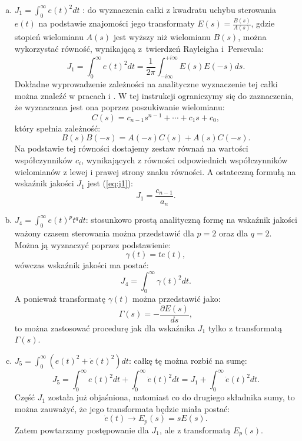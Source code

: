 \documentclass{article}
\begin{document}
    \begin{enumerate}[(a)]
        \item $J_{1} = \int_{0}^{\infty}{e(t)^{2}dt}$ : do wyznaczenia całki z kwadratu uchybu sterowania $e(t)$ na podstawie znajomości jego transformaty $E(s) = \frac{B(s)}{A(s)}$, gdzie stopień wielomianu $A(s)$ jest wyższy niż wielomianu $B(s)$, można wykorzystać równość, wynikającą z~twierdzeń Rayleigha i~Persevala:
        $$
            J_{1}
            =
            \int_{0}^{\infty}{e(t)^{2}dt}
            =
            \frac{1}{2\pi}\int_{-i\infty}^{+i\infty}{E(s)E(-s)ds}.
        $$
        Dokładne wyprowadzenie zależności na analityczne wyznaczenie tej całki można znaleźć w pracach \cite{Mitkowski2007} i \cite{Gorecki1993}.
        W tej instrukcji ograniczymy się do zaznaczenia, że wyznaczana jest ona poprzez poszukiwanie wielomianu:
        $$
            C(s) = c_{n-1}s^{n-1} + \cdots + c_{1}s + c_{0},
        $$
        który spełnia zależność:
        $$
            B(s)B(-s) = A(-s)C(s) + A(s)C(-s).
        $$
        Na podstawie tej równości dostajemy zestaw równań na wartości współczynników $c_i$, wynikających z równości odpowiednich współczynników wielomianów z lewej i prawej strony znaku równości.
        A ostateczną formułą na wskaźnik jakości $J_{1}$ jest (\ref{eq:j1}):
        \begin{equation}
            J_{1} = \frac{c_{n-1}}{a_{n}}.
        \end{equation}

        \item $J_{4} = \int_{0}^{\infty}{e(t)^{p}t^{q}dt}$: stosunkowo prostą analityczną formę na wskaźnik jakości ważony czasem sterowania można przedstawić dla $p =2$ oraz dla $q = 2$.
        Można ją wyznaczyć poprzez podstawienie:
        $$
            \gamma(t) = te(t),
        $$
        wówczas wskaźnik jakości ma postać:
        $$
            J_{4} = \int_{0}^{\infty}{\gamma(t)^{2}dt}.
        $$
        A ponieważ transformatę $\gamma(t)$ można przedstawić jako:
        $$
            \Gamma(s) = -\frac{\partial E(s)}{ds},
        $$
        to można zastosować procedurę jak dla wskaźnika $J_{1}$ tylko z transformatą $\Gamma(s)$.

        \item $J_{5} = \int_{0}^{\infty}{\left(e(t)^{2} + \dot{e}(t)^{2}\right)dt}$: całkę tę można rozbić na sumę:
        $$
            J_{5} = \int_{0}^{\infty}{e(t)^{2}dt}  + \int_{0}^{\infty}{\dot{e}(t)^{2}dt} = J_{1} + \int_{0}^{\infty}{\dot{e}(t)^{2}dt}.
        $$
        Część $J_{1}$ została już objaśniona, natomiast co do drugiego składnika sumy, to można zauważyć, że jego transformata będzie miała postać:
        $$
            \dot{e}(t) \rightarrow E_{p}(s) = sE(s).
        $$
        Zatem powtarzamy postępowanie dla $J_{1}$, ale z transformatą
        $E_{p}(s)$.
        

\end{enumerate}
\end{document}
